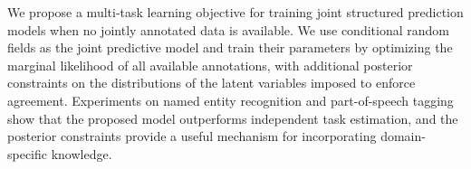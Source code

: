 We propose a multi-task learning objective for training joint structured prediction models when no jointly annotated data is available. We use conditional random fields as the joint predictive model and train their parameters by optimizing the marginal likelihood of all available annotations, with additional posterior constraints on the distributions of the latent variables imposed to enforce agreement. Experiments on named entity recognition and part-of-speech tagging show that the proposed model outperforms independent task estimation, and the posterior constraints provide a useful mechanism for incorporating domain-specific knowledge.
